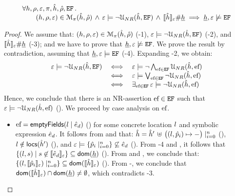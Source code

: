 \begin{lemma}
$$
\begin{array}{l}
  \forall h, \rho, \varepsilon, \pi, \hat{h}, \hat\rho, \mathtt{EF} \, . \\
        \qquad (h, \rho, \varepsilon) \in \mathcal{M}_{\pi}(\hat{h}, \hat\rho)
           \, \wedge \, \varepsilon \models \neg {\cal U}_{NR}(\hat{h}, \mathtt{EF}) 
           \, \wedge \, \llbracket \hat{h} \rrbracket_{\varepsilon} \# \underline{h} 
              \implies \underline{h}, \varepsilon \not\models \mathtt{EF}
\end{array}
$$
\end{lemma}
\begin{proof}
We assume that: 
$(h, \rho, \varepsilon) \in \mathcal{M}_{\pi}(\hat{h}, \hat\rho)$ (\hyp{1}), 
$\varepsilon \models \neg {\cal U}_{NR}(\hat{h}, \mathtt{EF})$ (\hyp{2}), and
$\llbracket \hat{h} \rrbracket_{\varepsilon} \# \underline{h}$ (\hyp{3}); and we have to prove that 
$\underline{h}, \varepsilon \not\models \mathtt{EF}$. 
We prove the result by contradiction, assuming that $\underline{h}, \varepsilon \models \mathtt{EF}$ (\hyp{4}). 
Expanding \hyp{2}, we obtain: 
$$
\begin{array}{lll}
  \varepsilon \models \neg {\cal U}_{NR}(\hat{h}, \mathtt{EF})  &  \iff & \varepsilon \models \neg \bigwedge_{\mathtt{\text{ef}} \in \mathtt{EF}}  {\cal U}_{NR}(\hat{h}, \mathtt{\text{ef}}) \\ 
  & \iff & \varepsilon \models \bigvee_{\mathtt{\text{ef}} \in \mathtt{EF}}  \neg{\cal U}_{NR}(\hat{h}, \mathtt{\text{ef}}) \\
  & \iff & \exists_{\mathtt{\text{ef}} \in \mathtt{EF}} \, \varepsilon \models \neg{\cal U}_{NR}(\hat{h}, \mathtt{\text{ef}})
\end{array}
$$
Hence, we conclude that there is an NR-assertion $\mathtt{\text{ef}} \in \mathtt{EF}$ such that $\varepsilon \models \neg{\cal U}_{NR}(\hat{h}, \mathtt{\text{ef}})$ (). 
We proceed by case analysis on $\mathtt{\text{ef}}$. 
\begin{itemize}
   \item $\mathtt{\text{ef}} = \mathsf{emptyFields}(l \mid \hat{e}_d)$ () for some concrete location $l$ and symbolic expression $\hat{e}_d$. 
            It follows from  and  that: 
            $\hat{h} = \hat{h}' \, \uplus \,  \big((l, \hat{p}_i) \mapsto -\big)\mid_{i = 0}^n$ (), $l \notin {\sf locs}(\hat{h}')$ (), 
            and $\varepsilon \models \{ \hat{p}_i \mid_{i = 0}^n \} \not\subseteq \hat{e}_d$ (). 
            From \hyp{4} and , it follows that $\{ (l, s) \mid s \not\in \llbracket \hat{e}_d \rrbracket_{\varepsilon} \} \subseteq \mathsf{dom}(\underline{h})$ ().
            From  and , we conclude that: $\{ (l, \llbracket \hat{p}_i \rrbracket_{\varepsilon}) \mid_{i=0}^n \} \subseteq \mathsf{dom}(\llbracket \hat{h} \rrbracket_{\varepsilon})$ ().               
            From -, we conclude that $\mathsf{dom}(\llbracket \hat{h} \rrbracket_{\varepsilon}) \cap \mathsf{dom}(\underline{h}) \neq \emptyset$, which contradicts \hyp{3}.
            

\end{itemize}
\end{proof}

